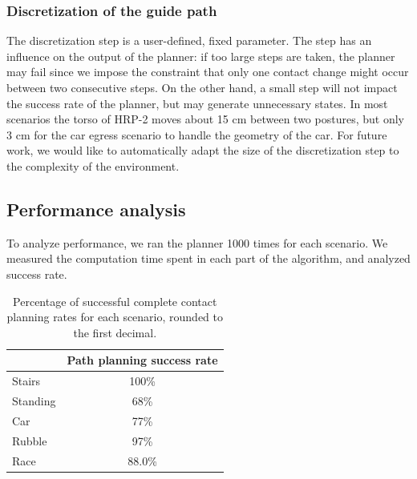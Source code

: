 \documentclass[journal]{IEEEtran}
\providecommand{\DIFaddtex}[1]{#1} %
\providecommand{\DIFdeltex}[1]{} %
\providecommand{\DIFdelbegin}{\protect\cbdelete} %
\providecommand{\DIFdelend}{} %
\providecommand{\DIFaddFL}[1]{\DIFadd{#1}} %
\providecommand{\DIFaddbeginFL}{} %
\providecommand{\DIFaddendFL}{} %
\providecommand{\DIFdelendFL}{} %
\providecommand{\DIFadd}[1]{\texorpdfstring{\DIFaddtex{#1}}{#1}} %
\providecommand{\DIFdel}[1]{\texorpdfstring{\DIFdeltex{#1}}{}} %
\begin{document}
\subsubsection{Discretization of the guide path} \label{sec:disc}
The discretization step is a user-defined, fixed parameter. The step
has an influence on the output of the planner: if too large steps are taken,
the planner may fail since we impose the constraint that only one contact change might occur
between two consecutive steps. On the other hand, a small step will not impact the success rate of the planner, 
but may generate unnecessary states. In most scenarios the torso of HRP-2 moves about 15 cm between two postures, but only 3 cm
for the car egress scenario to handle the geometry of the car.
For future work, we would like to automatically adapt the size of the discretization step to the complexity of the environment.

\subsection{Performance analysis} \label{sec:perf}
To analyze performance, we ran the planner 1000 times for each scenario.
We measured the computation time spent in each part of the algorithm, and analyzed \DIFdelbegin \DIFdel{their }\DIFdelend success rate.




\DIFdelbegin %
\DIFdelendFL \DIFaddbeginFL \begin{table}
\DIFaddendFL \centering
\DIFaddbeginFL \begin{tabular}{ l | c}
  &  \DIFaddFL{Path planning success rate }\\
 \hline
   \DIFaddFL{Stairs     	}& \DIFaddFL{100\% }\\
   \DIFaddFL{Standing			}& \DIFaddFL{68\% 	}\\
   \DIFaddFL{Car 			}& \DIFaddFL{77\% 	}\\
   \DIFaddFL{Rubble 				}& \DIFaddFL{97\% 	}\\
   \DIFaddFL{Race        }& \DIFaddFL{88.0\% 	}\\
 \end{tabular}
\caption{ \DIFaddFL{Percentage of successful complete contact planning rates for each scenario, rounded to the first decimal.}}
\label{tab:sucess_planning}
\quad
\end{table}
\end{document}
